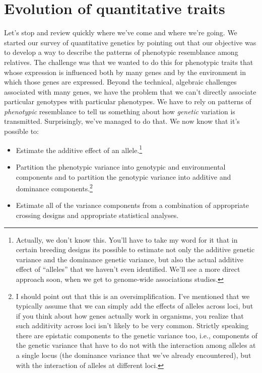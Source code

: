\chapter{Evolution of quantitative traits}

Let's stop and review quickly where we've come and where we're
going. We started our survey of quantitative genetics by pointing out
that our objective was to develop a way to describe the patterns of
phenotypic resemblance among relatives. The challenge was that we
wanted to do this for phenotypic traits that whose expression is
influenced both by many genes and by the environment in which those
genes are expressed. Beyond the technical, algebraic challenges
associated with many genes, we have the problem that we can't directly
associate particular genotypes with particular phenotypes. We have to
rely on patterns of {\it phenotypic\/} resemblance to tell us
something about how {\it genetic\/} variation is
transmitted. Surprisingly, we've managed to do that. We now know that
it's possible to:

\begin{itemize}

\item Estimate the additive effect of an allele.\footnote{Actually, we
    don't know this. You'll have to take my word for it that in
    certain breeding designs its possible to estimate not only the
    additive genetic variance and the dominance genetic variance, but
    also the actual additive effect of ``alleles'' that we haven't
    even identified. We'll see a more direct approach soon, when we
    get to genome-wide associations studies.}

\item Partition the phenotypic variance into genotypic and
  environmental components and to partition the genotypic variance
  into additive and dominance components.\footnote{I should point out
    that this is an oversimplification. I've mentioned that we
    typically assume that we can simply add the effects of alleles
    across loci, but if you think about how genes actually work in
    organisms, you realize that such additivity across loci isn't
    likely to be very common. Strictly speaking there are epistatic
    components to the genetic variance too, i.e., components of the
    genetic variance that have to do not with the interaction among
    alleles at a single locus (the dominance variance that we've
    already encountered), but with the interaction of alleles at
    different loci.}

\item Estimate all of the variance components from a combination of
appropriate crossing designs and appropriate statistical analyses.

\end{itemize}

